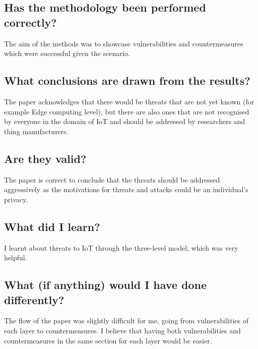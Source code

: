 \documentclass[11pt,a4paper]{article}
\begin{document}
\subsection*{Has the methodology been performed correctly?}
The aim of the methods was to showcase vulnerabilities and countermeasures which were successful given the scenario. 

\subsection*{What conclusions are drawn from the results?}
The paper acknowledges that there would be threats that are not yet known (for example Edge computing level), but there are also ones that are not recognised by everyone in the domain of IoT and should be addressed by researchers and thing manufacturers. 

\subsection*{Are they valid?}
The paper is correct to conclude that the threats should be addressed aggressively as the motivations for threats and attacks could be an individual’s privacy. 

\subsection*{What did I learn?}
I learnt about threats to IoT through the three-level model, which was very helpful. 

\subsection*{What (if anything) would I have done differently?}
The flow of the paper was slightly difficult for me, going from vulnerabilities of each layer to countermeasures. I believe that having both vulnerabilities and countermeasures in the same section for each layer would be easier. 
\end{document}
